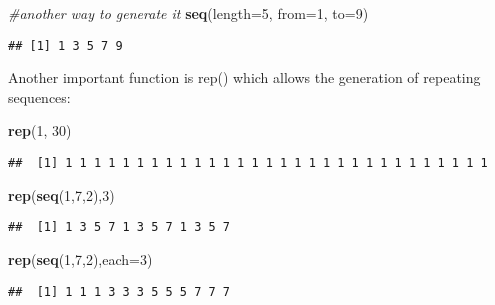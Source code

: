 \documentclass[]{book}
\newenvironment{Shaded}{\begin{snugshade}}{\end{snugshade}}
\newcommand{\KeywordTok}[1]{\textcolor[rgb]{0.13,0.29,0.53}{\textbf{#1}}}
\newcommand{\DataTypeTok}[1]{\textcolor[rgb]{0.13,0.29,0.53}{#1}}
\newcommand{\DecValTok}[1]{\textcolor[rgb]{0.00,0.00,0.81}{#1}}
\newcommand{\CommentTok}[1]{\textcolor[rgb]{0.56,0.35,0.01}{\textit{#1}}}
\newcommand{\NormalTok}[1]{#1}
\theoremstyle{definition}
\theoremstyle{definition}
\theoremstyle{definition}
\theoremstyle{remark}
\begin{document}
\begin{Shaded}
\begin{Highlighting}[]
\CommentTok{#another way to generate it}
\KeywordTok{seq}\NormalTok{(}\DataTypeTok{length=}\DecValTok{5}\NormalTok{, }\DataTypeTok{from=}\DecValTok{1}\NormalTok{, }\DataTypeTok{to=}\DecValTok{9}\NormalTok{)}
\end{Highlighting}
\end{Shaded}

\begin{verbatim}
## [1] 1 3 5 7 9
\end{verbatim}

Another important function is rep() which allows the generation of
repeating sequences:

\begin{Shaded}
\begin{Highlighting}[]
\KeywordTok{rep}\NormalTok{(}\DecValTok{1}\NormalTok{, }\DecValTok{30}\NormalTok{)}
\end{Highlighting}
\end{Shaded}

\begin{verbatim}
##  [1] 1 1 1 1 1 1 1 1 1 1 1 1 1 1 1 1 1 1 1 1 1 1 1 1 1 1 1 1 1 1
\end{verbatim}

\begin{Shaded}
\begin{Highlighting}[]
\KeywordTok{rep}\NormalTok{(}\KeywordTok{seq}\NormalTok{(}\DecValTok{1}\NormalTok{,}\DecValTok{7}\NormalTok{,}\DecValTok{2}\NormalTok{),}\DecValTok{3}\NormalTok{)}
\end{Highlighting}
\end{Shaded}

\begin{verbatim}
##  [1] 1 3 5 7 1 3 5 7 1 3 5 7
\end{verbatim}

\begin{Shaded}
\begin{Highlighting}[]
\KeywordTok{rep}\NormalTok{(}\KeywordTok{seq}\NormalTok{(}\DecValTok{1}\NormalTok{,}\DecValTok{7}\NormalTok{,}\DecValTok{2}\NormalTok{),}\DataTypeTok{each=}\DecValTok{3}\NormalTok{)}
\end{Highlighting}
\end{Shaded}

\begin{verbatim}
##  [1] 1 1 1 3 3 3 5 5 5 7 7 7
\end{verbatim}
\end{document}
